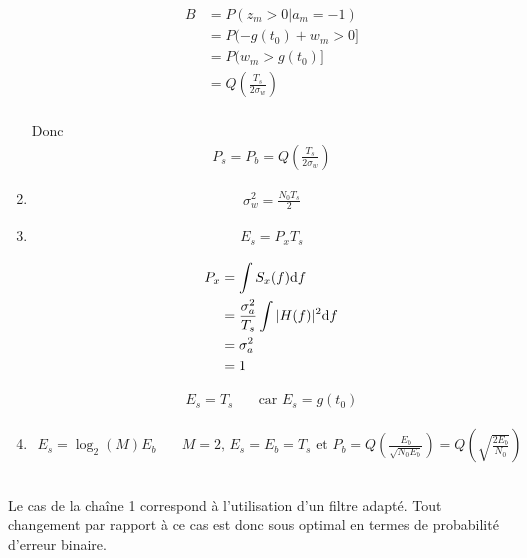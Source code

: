 \documentclass{article}
\begin{document}
\begin{enumerate}
    \begin{align*}
        B &= P(z_m > 0 | a_m = -1) \\
          &= P(-g(t_0) + w_m > 0 ] \\
          &= P(w_m > g(t_0)]  \\
          &= Q\left( \frac{T_s}{2 \sigma_w} \right)  \\
    \end{align*}

    Donc \begin{align*}
        P_s = P_b = Q\left( \frac{T_s}{2 \sigma_w} \right) 
    \end{align*}

\item 
    \begin{align*}
        \sigma_w^2 = \frac{N_0 T_s}{2}
    \end{align*}

    \item \begin{align*}
        E_s = P_x T_s
    \end{align*}

    \begin{align*}
        P_x &= \int S_x(f) \mathrm{d}f \\
        &= \frac{\sigma_a^2}{T_s} \int |H(f)|^2 \mathrm{d}f \\
        &= \sigma_a^2 \\
        &= 1 \\
    \end{align*}

    \begin{align*}
        E_s = T_s \quad&\text{car $E_s = g(t_0)$}
    \end{align*}

\item 
    \begin{align*}
        E_s = \log_2(M) E_b \quad&\text{$M=2$, $E_s = E_b = T_s$ et $P_b = Q\left( \frac{E_b}{\sqrt{N_0 E_b} } \right) = Q\left( \sqrt{\frac{2 E_b}{N_0}}  \right)  $}
    \end{align*}

\end{enumerate}

\subsection{}
Le cas de la chaîne 1 correspond à l'utilisation d'un filtre adapté.
Tout changement par rapport à ce cas est donc sous optimal en termes de probabilité d'erreur binaire.
\end{document}
